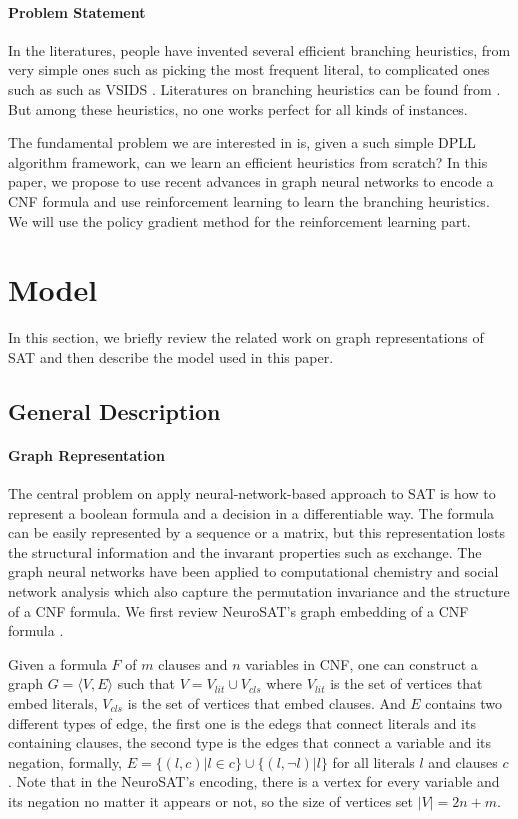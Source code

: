 \documentclass[sigplan,10pt]{acmart}\settopmatter{printfolios=true,printccs=false,printacmref=false}
\begin{document}
\paragraph{Problem Statement}

In the literatures, people have invented several efficient branching heuristics, 
from very simple ones such as picking the most frequent literal, 
to complicated ones such as such as VSIDS \cite{zhang2002quest}.
Literatures on branching heuristics can be found from \cite{hooker1995branching, li1997heuristics}.
But among these heuristics, no one works perfect for all kinds of instances.

The fundamental problem we are interested in is, given a such simple DPLL algorithm
framework, can we learn an efficient heuristics from scratch?
In this paper, we propose to use recent advances in graph neural networks to 
encode a CNF formula and use reinforcement learning to learn the branching heuristics.
We will use the policy gradient method for the reinforcement learning part.

\section{Model}

In this section, we briefly review the related work on graph representations of SAT
and then describe the model used in this paper.

\subsection{General Description}

\paragraph{Graph Representation}

The central problem on apply neural-network-based approach to SAT is how to 
represent a boolean formula and a decision in a differentiable way.
The formula can be easily represented by a sequence or a matrix, but this
representation losts the structural information and the invarant properties such as
exchange.
The graph neural networks have been applied to computational chemistry and 
social network analysis which also capture the permutation invariance and the 
structure of a CNF formula.
We first review NeuroSAT's graph embedding of a CNF formula \cite{selsam2018learning}.

Given a formula $F$ of $m$ clauses and $n$ variables in CNF, 
one can construct a graph $G = \langle V, E \rangle$ such that 
$V = V_{lit} \cup V_{cls}$ where $V_{lit}$ is the set of vertices that embed literals,
$V_{cls}$ is the set of vertices that embed clauses. 
And $E$ contains two different types of edge, the first one is the edegs that connect literals and its
containing clauses, the second type is the edges that connect a variable and its negation, formally,
$ E = \{ (l, c) | l \in c \} \cup \{ (l, \neg l) | l \}$ for all literals $l$ and clauses $c$.
Note that in the NeuroSAT's encoding, there is a vertex for every variable and its negation no matter
it appears or not, so the size of vertices set $|V| = 2n + m$.
\end{document}

